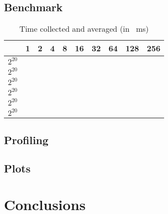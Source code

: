 \documentclass[]{article}
\begin{document}
\subsection{Benchmark}
\label{sec:benchmark}
\begin{table}[H]
	\centering
	\begin{tabular}{l|*{9}r}
		\toprule
		\diagbox{$n$}{$\mathit{nw}$} 
		& 1 & 2 & 4 & 8 & 16 & 32 & 64 & 128 & 256 \\
		\midrule
		$2^{20}$ \\
		$2^{20}$ \\
		$2^{20}$ \\
		$2^{20}$ \\
		$2^{20}$ \\
		$2^{20}$ \\
		\bottomrule
	\end{tabular}%
	\label{tab:benchmark}%
	\caption{Time collected and averaged (in \SI{}{\milli \second})}
\end{table}%


\subsection{Profiling}
\label{sec:profile}

\subsection{Plots}
\label{sec:plots}

\section{Conclusions}
\label{sec:conclusion}
\end{document}
